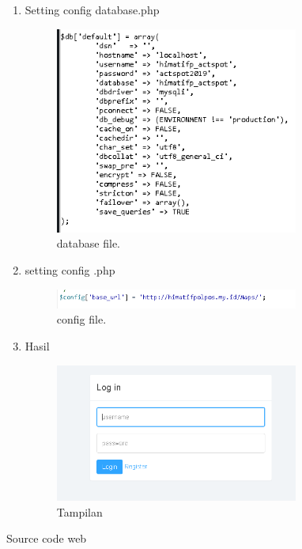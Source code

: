 \begin{itemize}
\begin{enumerate}
	\item Setting config database.php
\begin{figure}[H]
	\includegraphics[width=8cm]{figures/web/4_databasesetting.PNG}
	\centering
	\caption{database file.}
\end{figure}	
	\item setting config .php
\begin{figure}[H]
	\includegraphics[width=8cm]{figures/web/5_config.PNG}
	\centering
	\caption{config file.}
\end{figure}	

	\item Hasil
\begin{figure}[H]
	\includegraphics[width=8cm]{figures/web/6_tampilan.PNG}
	\centering
	\caption{Tampilan}
\end{figure}	
	\end{enumerate}
\end{itemize}


Source code web























